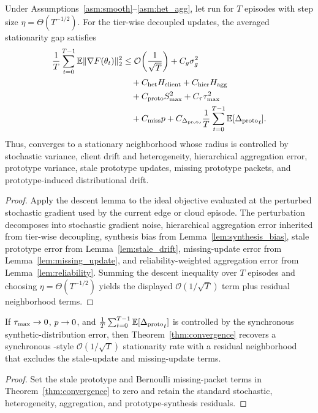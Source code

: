 \begin{theorem}\label{thm:convergence}
Under Assumptions~\ref{asm:smooth}--\ref{asm:het_agg}, let \ehsfp run for $T$ episodes with step size $\eta=\Theta(T^{-1/2})$. For the tier-wise decoupled updates, the averaged stationarity gap satisfies
\begin{equation}
    \begin{split}
    \frac{1}{T}\sum_{t=0}^{T-1}
    \mathbb{E}\|\nabla F(\theta_t)\|_2^2
    &\leq
    \mathcal{O}\!\left(\frac{1}{\sqrt{T}}\right)
    +
    C_g\sigma_g^2
    \\
    &\quad
    +
    C_{\mathrm{het}}H_{\mathrm{client}}
    +
    C_{\mathrm{hier}}H_{\mathrm{agg}}
    \\
    &\quad
    +
    C_{\mathrm{proto}}S_{\max}^2
    +
    C_{\tau}\tau_{\max}^2
    \\
    &\quad
    +
    C_{\mathrm{miss}}p
    +
    C_{{\Delta_{\mathrm{proto}}}}\frac{1}{T}\sum_{t=0}^{T-1}\mathbb{E}[{\Delta_{\mathrm{proto}}}_t].
    \end{split}
\end{equation}
Thus, \ehsfp converges to a stationary neighborhood whose radius is controlled by stochastic variance, client drift and heterogeneity, hierarchical aggregation error, prototype variance, stale prototype updates, missing prototype packets, and prototype-induced distributional drift.
\end{theorem}
\begin{proof}
Apply the descent lemma to the ideal objective evaluated at the perturbed stochastic gradient used by the current edge or cloud episode. The perturbation decomposes into stochastic gradient noise, hierarchical aggregation error inherited from tier-wise decoupling, synthesis bias from Lemma~\ref{lem:synthesis_bias}, stale prototype error from Lemma~\ref{lem:stale_drift}, missing-update error from Lemma~\ref{lem:missing_update}, and reliability-weighted aggregation error from Lemma~\ref{lem:reliability}. Summing the descent inequality over $T$ episodes and choosing $\eta=\Theta(T^{-1/2})$ yields the displayed $\mathcal{O}(1/\sqrt{T})$ term plus residual neighborhood terms.
\end{proof}

\begin{corollary}\label{cor:small_perturb}
If $\tau_{\max}\rightarrow0$, $p\rightarrow0$, and $\frac{1}{T}\sum_{t=0}^{T-1}\mathbb{E}[{\Delta_{\mathrm{proto}}}_t]$ is controlled by the synchronous \hsfp synthetic-distribution error, then Theorem~\ref{thm:convergence} recovers a synchronous \hsfp-style $\mathcal{O}(1/\sqrt{T})$ stationarity rate with a residual neighborhood that excludes the stale-update and missing-update terms.
\end{corollary}
\begin{proof}
Set the stale prototype and Bernoulli missing-packet terms in Theorem~\ref{thm:convergence} to zero and retain the standard stochastic, heterogeneity, aggregation, and prototype-synthesis residuals.
\end{proof}

